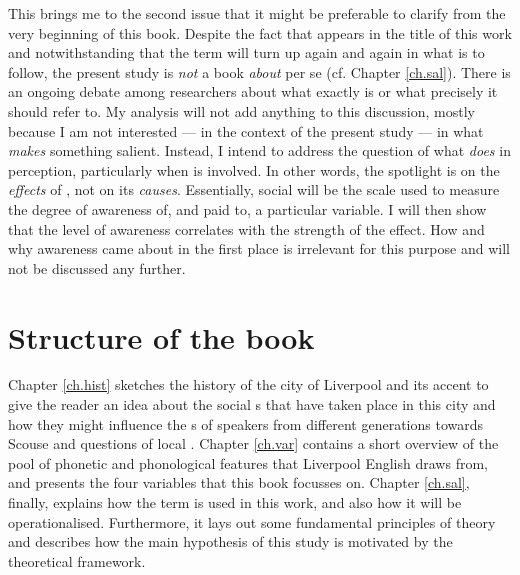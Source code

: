 This brings me to the second issue that it might be preferable to clarify from the very beginning of this book.
Despite the fact that \emph{} appears in the title of this work and notwithstanding that the term will turn up again and again in what is to follow, the present study is \emph{not} a book \emph{about}  per se (cf. Chapter \ref{ch.sal}).
There is an ongoing debate among researchers about what exactly  is or what precisely it should refer to.
My analysis will not add anything to this discussion, mostly because I am not interested --- in the context of the present study --- in what \emph{makes} something salient.
Instead, I intend to address the question of what  \emph{does} in perception, particularly when  is involved.
In other words, the spotlight is on the \emph{effects} of , not on its \emph{causes}.
Essentially, social  will be the scale used to measure the degree of awareness of, and  paid to, a particular variable.
I will then show that the level of awareness correlates with the strength of the  effect.
How and why awareness came about in the first place is irrelevant for this purpose and will not be discussed any further.

\section{Structure of the book}
\label{sec.intro.structure}

Chapter \ref{ch.hist} sketches the history of the city of Liverpool and its accent to give the reader an idea about the social s that have taken place in this city and how they might influence the s of speakers from different generations towards Scouse and questions of local .
Chapter \ref{ch.var} contains a short overview of the pool of phonetic and phonological features that Liverpool English draws from, and presents the four variables that this book focusses on.
Chapter \ref{ch.sal}, finally, explains how the term \emph{} is used in this work, and also how it will be operationalised.
Furthermore, it lays out some fundamental principles of  theory and describes how the main hypothesis of this study is motivated by the theoretical framework.

